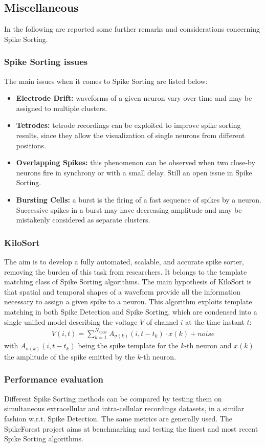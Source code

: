 \subsection{Miscellaneous}
In the following are reported some further remarks and considerations concerning
Spike Sorting.
\subsubsection{Spike Sorting issues}
The main issues when it comes to Spike Sorting are listed below:
\begin{itemize}
    \item \textbf{Electrode Drift:} waveforms of a given neuron vary over
    time and may be assigned to multiple clusters.
    \item \textbf{Tetrodes:} tetrode recordings can be exploited to improve
    spike sorting results, since they allow the visualization of single
    neurons from different positions.
    \item \textbf{Overlapping Spikes:} this phenomenon can be observed when
    two close-by neurons fire in synchrony or with a small delay. Still 
    an open issue in Spike Sorting.
    \item \textbf{Bursting Cells:} a burst is the firing of a fast sequence
    of spikes by a neuron. Successive spikes in a burst may have decreasing
    amplitude and may be mistakenly considered as separate clusters.
\end{itemize}
\subsubsection{KiloSort}
The aim is to develop a fully automated, scalable, and accurate spike sorter,
removing the burden of this task from researchers. It belongs to the template
matching class of Spike Sorting algorithms.
The main hypothesis of KiloSort is that spatial and temporal shapes of a waveform
provide all the information necessary to assign a given spike to a neuron.
This algorithm exploits template matching in both Spike Detection and Spike
Sorting, which are condensed into a single unified model describing the voltage
\(V\) of channel \(i\) at the time instant \(t\):
\begin{align*}
    V(i,t)=\sum_{k=1}^{N_{spike}}A_{\sigma(k)}(i,t-t_k)\cdot x(k) + noise
\end{align*}
with \(A_{\sigma(k)}(i,t-t_k)\) being the spike template for the \(k\)-th neuron
and \(x(k)\) the amplitude of the spike emitted by the \(k\)-th neuron.
\subsubsection{Performance evaluation}
Different Spike Sorting methods can be compared by testing them on simultaneous
extracellular and intra-cellular recordings datasets, in a similar fashion w.r.t.
Spike Detection. The same metrics are generally used. The SpikeForest project
aims at benchmarking and testing the finest and most recent Spike Sorting
algorithms.